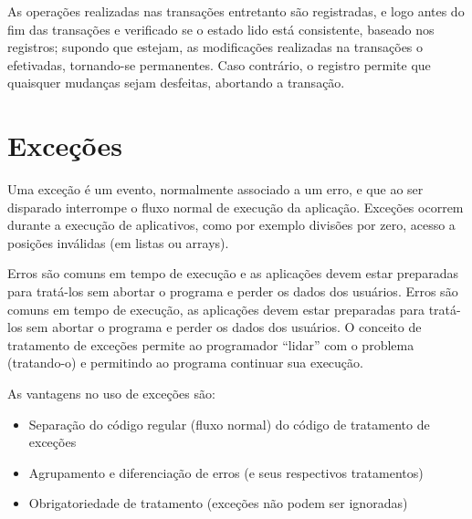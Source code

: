 As operações realizadas nas transações entretanto são registradas, e logo antes do fim das 
transações e verificado se o estado lido está consistente, baseado nos registros; supondo 
que estejam, as modificações realizadas na transações o efetivadas, tornando-se permanentes. 
Caso contrário, o registro permite que quaisquer mudanças sejam desfeitas, abortando a transação.


\section{Exceções}

Uma exceção é um evento, normalmente associado a um erro, e que ao ser disparado interrompe o 
fluxo normal de execução da aplicação. Exceções ocorrem durante a execução de aplicativos, como 
por exemplo divisões por zero, acesso a posições inválidas (em listas ou arrays).


Erros são comuns em tempo de execução e as aplicações devem estar preparadas para tratá-los 
sem abortar o programa e perder os dados dos usuários. Erros são comuns em tempo de execução, 
as aplicações devem estar preparadas para tratá-los sem abortar o programa e perder os dados 
dos usuários. O conceito de tratamento de exceções permite ao programador ``lidar'' com o 
problema (tratando-o) e permitindo ao programa continuar sua execução.

As vantagens no uso de exceções são: 

\begin{itemize}
\item Separação do código regular (fluxo normal) do código de tratamento de exceções
\item Agrupamento e diferenciação de erros (e seus respectivos tratamentos)
\item Obrigatoriedade de tratamento (exceções não podem ser ignoradas)
\end{itemize}


